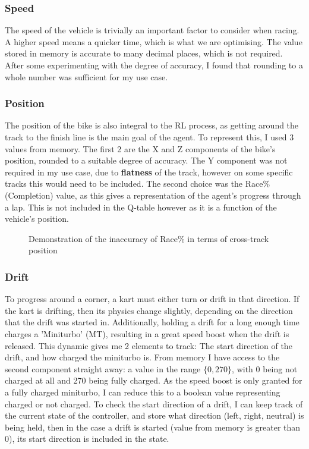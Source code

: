 \subsubsection{Speed}
The speed of the vehicle is trivially an important factor to consider when racing. A higher speed means a quicker time, which is what we are optimising. The value stored in memory is accurate to many decimal places, which is not required. After some experimenting with the degree of accuracy, I found that rounding to a whole number was sufficient for my use case.
\subsubsection{Position}
The position of the bike is also integral to the RL process, as getting around the track to the finish line is the main goal of the agent. To represent this, I used 3 values from memory. The first 2 are the X and Z components of the bike's position, rounded to a suitable degree of accuracy. The Y component was not required in my use case, due to \textbf{flatness} of the track, however on some specific tracks this would need to be included. The second choice was the Race\% (Completion) value, as this gives a representation of the agent's progress through a lap. This is not included in the Q-table however as it is a function of the vehicle's position.
\begin{figure}[ht]
    \centering
    \hfill
    \caption{Demonstration of the inaccuracy of Race\% in terms of cross-track position}
\end{figure}
\subsubsection{Drift}
To progress around a corner, a kart must either turn or drift in that direction. If the kart is drifting, then its physics change slightly, depending on the direction that the drift was started in. Additionally, holding a drift for a long enough time charges a 'Miniturbo' (MT), resulting in a great speed boost when the drift is released. This dynamic gives me 2 elements to track: The start direction of the drift, and how charged the miniturbo is. From memory I have access to the second component straight away: a value in the range $\{0,270\}$, with 0 being not charged at all and 270 being fully charged. As the speed boost is only granted for a fully charged miniturbo, I can reduce this to a boolean value representing charged or not charged. To check the start direction of a drift, I can keep track of the current state of the controller, and store what direction (left, right, neutral) is being held, then in the case a drift is started (value from memory is greater than 0), its start direction is included in the state.
